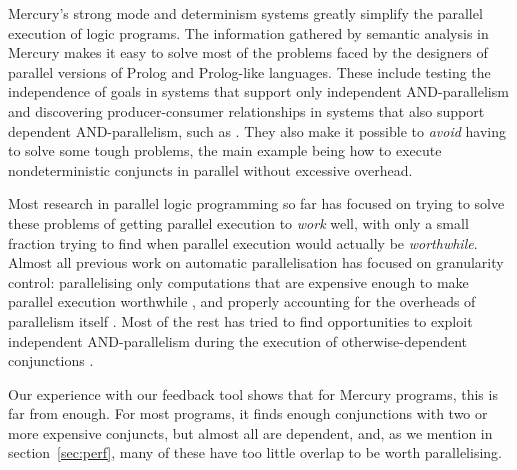 Mercury's strong mode and determinism systems
greatly simplify the parallel execution of logic programs.
The information gathered by semantic analysis in Mercury
makes it easy to solve most of the problems faced by the
designers of parallel versions of Prolog and Prolog-like languages.
These include testing the independence of goals
in systems that support only independent AND-parallelism
and discovering producer-consumer relationships
in systems that also support dependent AND-parallelism,
such as \cite{DBLP:journals/tcs/GrasH09}.
They also make it possible to \emph{avoid} having to solve some tough problems,
the main example being how to execute nondeterministic conjuncts in parallel
without excessive overhead.


Most research in parallel logic programming so far
has focused on trying to solve these problems
of getting parallel execution to \emph{work} well,
with only a small fraction trying to find
when parallel execution would actually be \emph{worthwhile}.
Almost all previous work on automatic parallelisation
has focused on granularity control:
parallelising only computations that are expensive enough
to make parallel execution
worthwhile \cite{harris_07_feedback_imp_par,lopez96:distance_granularity},
and properly accounting for the overheads
of parallelism itself \cite{shen_98_granularity-control}.
Most of the rest has tried to find opportunities
to exploit independent AND-parallelism
during the execution of otherwise-dependent conjunctions
\cite{DBLP:journals/jlp/MuthukumarBBH99,DBLP:conf/lopstr/CasasCH07}.

Our experience with our feedback tool shows that
for Mercury programs, this is far from enough.
For most programs,
it finds enough conjunctions with two or more expensive conjuncts,
but almost all are dependent,
and, as we mention in section~\ref{sec:perf},
many of these have too little overlap to be worth parallelising.

